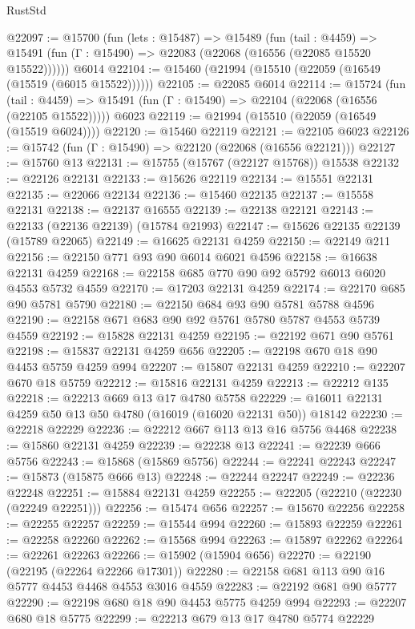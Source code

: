 \begin{lexlean}{RustStd}
\begin{coremodule}
@22097 := @15700
    (fun (lets : @15487) =>
    @15489
      (fun (tail : @4459) =>
      @15491 (fun (Γ : @15490) => @22083 (@22068 (@16556 (@22085 @15520 @15522))))))
    @6014
@22104 := @15460 (@21994 (@15510 (@22059 (@16549 (@15519 (@6015 @15522))))))
@22105 := @22085 @6014
@22114 := @15724
    (fun (tail : @4459) => @15491 (fun (Γ : @15490) => @22104 (@22068 (@16556 (@22105 @15522)))))
    @6023
@22119 := @21994 (@15510 (@22059 (@16549 (@15519 @6024))))
@22120 := @15460 @22119
@22121 := @22105 @6023
@22126 := @15742 (fun (Γ : @15490) => @22120 (@22068 (@16556 @22121)))
@22127 := @15760 @13
@22131 := @15755 (@15767 (@22127 @15768)) @15538
@22132 := @22126 @22131
@22133 := @15626 @22119
@22134 := @15551 @22131
@22135 := @22066 @22134
@22136 := @15460 @22135
@22137 := @15558 @22131
@22138 := @22137 @16555
@22139 := @22138 @22121
@22143 := @22133 (@22136 @22139) (@15784 @21993)
@22147 := @15626 @22135 @22139 (@15789 @22065)
@22149 := @16625 @22131 @4259
@22150 := @22149 @211
@22156 := @22150 @771 @93 @90 @6014 @6021 @4596
@22158 := @16638 @22131 @4259
@22168 := @22158 @685 @770 @90 @92 @5792 @6013 @6020 @4553 @5732 @4559
@22170 := @17203 @22131 @4259
@22174 := @22170 @685 @90 @5781 @5790
@22180 := @22150 @684 @93 @90 @5781 @5788 @4596
@22190 := @22158 @671 @683 @90 @92 @5761 @5780 @5787 @4553 @5739 @4559
@22192 := @15828 @22131 @4259
@22195 := @22192 @671 @90 @5761
@22198 := @15837 @22131 @4259 @656
@22205 := @22198 @670 @18 @90 @4453 @5759 @4259 @994
@22207 := @15807 @22131 @4259
@22210 := @22207 @670 @18 @5759
@22212 := @15816 @22131 @4259
@22213 := @22212 @135
@22218 := @22213 @669 @13 @17 @4780 @5758
@22229 := @16011 @22131 @4259 @50 @13 @50 @4780 (@16019 (@16020 @22131 @50)) @18142
@22230 := @22218 @22229
@22236 := @22212 @667 @113 @13 @16 @5756 @4468
@22238 := @15860 @22131 @4259
@22239 := @22238 @13
@22241 := @22239 @666 @5756
@22243 := @15868 (@15869 @5756)
@22244 := @22241 @22243
@22247 := @15873 (@15875 @666 @13)
@22248 := @22244 @22247
@22249 := @22236 @22248
@22251 := @15884 @22131 @4259
@22255 := @22205 (@22210 (@22230 (@22249 @22251)))
@22256 := @15474 @656
@22257 := @15670 @22256
@22258 := @22255 @22257
@22259 := @15544 @994
@22260 := @15893 @22259
@22261 := @22258 @22260
@22262 := @15568 @994
@22263 := @15897 @22262
@22264 := @22261 @22263
@22266 := @15902 (@15904 @656)
@22270 := @22190 (@22195 (@22264 @22266 @17301))
@22280 := @22158 @681 @113 @90 @16 @5777 @4453 @4468 @4553 @3016 @4559
@22283 := @22192 @681 @90 @5777
@22290 := @22198 @680 @18 @90 @4453 @5775 @4259 @994
@22293 := @22207 @680 @18 @5775
@22299 := @22213 @679 @13 @17 @4780 @5774 @22229

\end{coremodule}
\end{lexlean}
